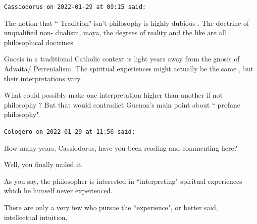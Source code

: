 \begin{footnotesize}
\begin{sffamily}
\texttt{Cassiodorus on 2022-01-29 at 09:15 said: }

The notion that `` Tradition" isn't philosophy is highly dubious . The doctrine of unqualified non- dualism, maya, the degrees of reality and the like are all philosophical doctrines 

Gnosis in a traditional Catholic context is light years away from the gnosis of Advaita/ Perrenialism. The spiritual experiences might actually be the same , but their interpretations vary.

What could possibly make one interpretation higher than another if not philosophy ? But that would contradict Guenon's main point about `` profane philosophy".


\hfill

\texttt{Cologero on 2022-01-29 at 11:56 said: }

How many years, Cassiodorus, have you been reading and commenting here?

Well, you finally nailed it.

As you say, the philosopher is interested in ``interpreting" spiritual experiences which he himself never experienced.

There are only a very few who pursue the ``experience", or better said, intellectual intuition.


\hfill


\end{sffamily}\end{footnotesize}
